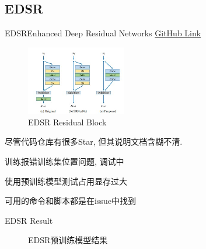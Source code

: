 \subsection{EDSR}
\begin{frame}{EDSR}{Enhanced Deep Residual Networks \href{https://github.com/sanghyun-son/EDSR-PyTorch}{GitHub Link}}
    \begin{figure}
        \centering
        \includegraphics[height=3cm]{pic/pic0103.jpg}
        \caption{EDSR Residual Block}
        \label{fig:0103}
    \end{figure}

    尽管代码仓库有很多Star, 但其说明文档含糊不清. 

    训练报错训练集位置问题, 调试中

    使用预训练模型测试占用显存过大

    可用的命令和脚本都是在issue中找到

\end{frame}

\begin{frame}{EDSR Result} 
    \small
    \begin{figure}[!htbp]
        \centering
        \quad
        \caption{EDSR预训练模型结果}
        \label{fig:0104}
    \end{figure}
\end{frame}

